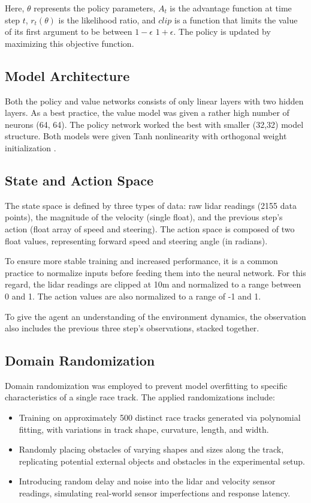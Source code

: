 \documentclass[a4paper, 10pt]{LTJournalArticle}
\begin{document}
Here, $\theta$ represents the policy parameters, $A_t$ is the advantage function at time step $t$, $r_t(\theta)$ is the likelihood ratio, and $clip$ is a function that limits the value of its first argument to be between $1-\epsilon$ $1+\epsilon$. The policy is updated by maximizing this objective function.

\subsection{Model Architecture}
Both the policy and value networks consists of only linear layers with two hidden layers. As a best practice, the value model was given a rather high number of neurons (64, 64). The policy network worked the best with smaller (32,32) model structure. Both models were given Tanh nonlinearity with orthogonal weight initialization \autocite{Hu:2020}.

\subsection{State and Action Space}
The state space is defined by three types of data: raw lidar readings (2155 data points), the magnitude of the velocity (single float), and the previous step's action (float array of speed and steering). The action space is composed of two float values, representing forward speed and steering angle (in radians).

To ensure more stable training and increased performance, it is a common practice to normalize inputs before feeding them into the neural network. For this regard, the lidar readings are clipped at 10m and normalized to a range between 0 and 1. The action values are also normalized to a range of -1 and 1.

To give the agent an understanding of the environment dynamics, the observation also includes the previous three step's observations, stacked together.

\subsection{Domain Randomization}
Domain randomization was employed to prevent model overfitting to specific characteristics of a single race track. The applied randomizations include:

\begin{itemize}
\item Training on approximately 500 distinct race tracks generated via polynomial fitting, with variations in track shape, curvature, length, and width.
\item Randomly placing obstacles of varying shapes and sizes along the track, replicating potential external objects and obstacles in the experimental setup.
\item Introducing random delay and noise into the lidar and velocity sensor readings, simulating real-world sensor imperfections and response latency.
\end{itemize}
\end{document}
